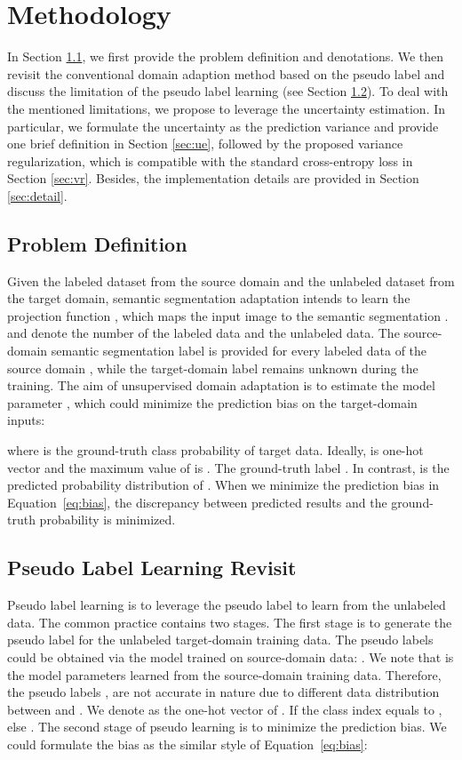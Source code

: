 \section{Methodology}
In Section \ref{sec:problem}, we first provide the problem definition and denotations. We then revisit the conventional domain adaption method based on the pseudo label and discuss the limitation of the pseudo label learning (see Section \ref{sec:revisit}). To deal with the mentioned limitations, we propose to leverage the uncertainty estimation. In particular, we formulate the uncertainty as the prediction variance and provide one brief definition in Section \ref{sec:ue}, followed by the proposed variance regularization, which is compatible with the standard cross-entropy loss in Section \ref{sec:vr}. Besides, the implementation details are provided in Section \ref{sec:detail}.

\subsection{Problem Definition} \label{sec:problem}
Given the labeled dataset  from the source domain and the unlabeled dataset  from the target domain, semantic segmentation adaptation intends to learn the projection function , which maps the input image  to the semantic segmentation .  and  denote the number of the labeled data and the unlabeled data. The source-domain semantic segmentation label  is provided for every labeled data of the source domain , while the target-domain label  remains unknown during the training. The aim of unsupervised domain adaptation is to estimate the model parameter , which could minimize the prediction bias on the target-domain inputs:

where  is the ground-truth class probability of target data. Ideally,  is one-hot vector and the maximum value of  is . The ground-truth label . 
In contrast,  is the predicted probability distribution of . When we minimize the prediction bias in Equation~\ref{eq:bias}, the discrepancy between predicted results and the ground-truth probability is minimized. 

\subsection{Pseudo Label Learning Revisit} \label{sec:revisit}

Pseudo label learning is to leverage the pseudo label to learn from the unlabeled data. The common practice contains two stages. The first stage is to generate the pseudo label for the unlabeled target-domain training data. The pseudo labels could be obtained via the model trained on source-domain data: .
We note that  is the model parameters learned from the source-domain training data. Therefore, the pseudo labels , are not accurate in nature due to different data distribution between  and . We denote  as the one-hot vector of . If the class index  equals to ,  else . 
The second stage of pseudo learning is to minimize the prediction bias. We could formulate the bias as the  similar style of Equation~\ref{eq:bias}:

